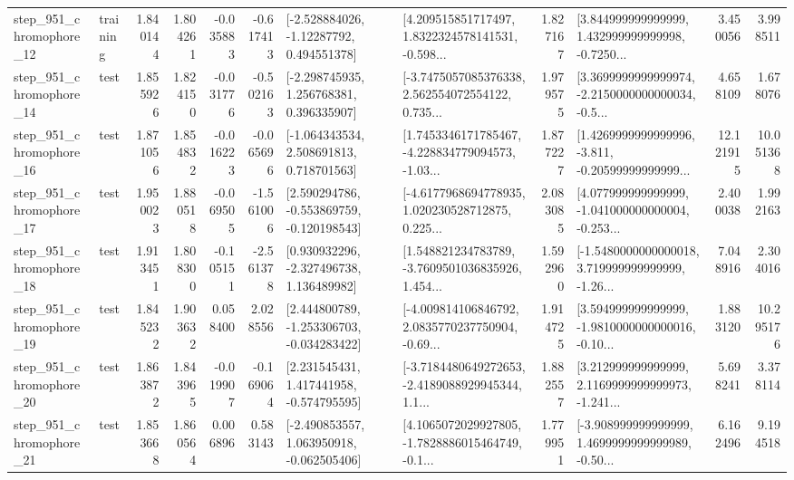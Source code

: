 \begin{tabular}{llrrrrllrlrr}
  step\_951\_chromophore\_12 &  training &      1.840144 &    1.804261 &     -0.035883 & -0.617413 &    [-2.528884026, -1.12287792, 0.494551378] &  [4.209515851717497, 1.8322324578141531, -0.598... &       1.827167 &  [3.844999999999999, 1.432999999999998, -0.7250... &            3.450056 &          3.998511 \\
  step\_951\_chromophore\_14 &      test &      1.855926 &    1.824150 &     -0.031776 & -0.502163 &    [-2.298745935, 1.256768381, 0.396335907] &  [-3.7475057085376338, 2.562554072554122, 0.735... &       1.979575 &  [3.3699999999999974, -2.2150000000000034, -0.5... &            4.658109 &          1.678076 \\
  step\_951\_chromophore\_16 &      test &      1.871056 &    1.854832 &     -0.016223 & -0.065696 &    [-1.064343534, 2.508691813, 0.718701563] &  [1.7453346171785467, -4.228834779094573, -1.03... &       1.877227 &  [1.4269999999999996, -3.811, -0.20599999999999... &           12.121915 &         10.051368 \\
  step\_951\_chromophore\_17 &      test &      1.950023 &    1.880518 &     -0.069505 & -1.561006 &   [2.590294786, -0.553869759, -0.120198543] &  [-4.6177968694778935, 1.020230528712875, 0.225... &       2.083085 &  [4.077999999999999, -1.041000000000004, -0.253... &            2.400038 &          1.992163 \\
  step\_951\_chromophore\_18 &      test &      1.913451 &    1.808300 &     -0.105151 & -2.561378 &    [0.930932296, -2.327496738, 1.136489982] &  [1.548821234783789, -3.7609501036835926, 1.454... &       1.592960 &  [-1.5480000000000018, 3.719999999999999, -1.26... &            7.048916 &          2.304016 \\
  step\_951\_chromophore\_19 &      test &      1.845232 &    1.903632 &      0.058400 &  2.028556 &   [2.444800789, -1.253306703, -0.034283422] &  [-4.009814106846792, 2.0835770237750904, -0.69... &       1.914725 &  [3.594999999999999, -1.9810000000000016, -0.10... &            1.883120 &         10.295176 \\
  step\_951\_chromophore\_20 &      test &      1.863872 &    1.843965 &     -0.019907 & -0.169064 &    [2.231545431, 1.417441958, -0.574795595] &  [-3.7184480649272653, -2.4189088929945344, 1.1... &       1.882557 &  [3.212999999999999, 2.1169999999999973, -1.241... &            5.698241 &          3.378114 \\
  step\_951\_chromophore\_21 &      test &      1.853668 &    1.860564 &      0.006896 &  0.583143 &   [-2.490853557, 1.063950918, -0.062505406] &  [4.1065072029927805, -1.7828886015464749, -0.1... &       1.779951 &  [-3.908999999999999, 1.4699999999999989, -0.50... &            6.162496 &          9.194518 \\

\end{tabular}
